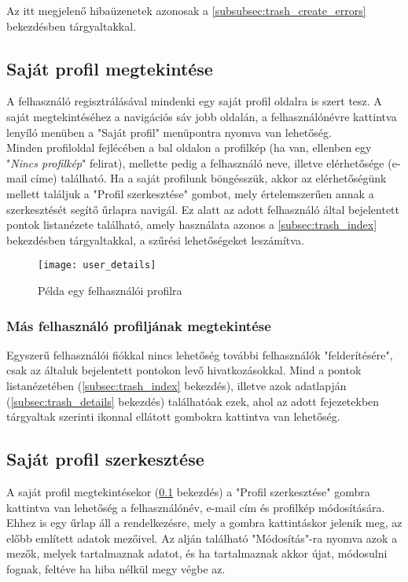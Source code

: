 Az itt megjelenő hibaüzenetek azonosak a \ref{subsubsec:trash_create_errors} bekezdésben tárgyaltakkal.

\subsection{Saját profil megtekintése}
\label{subsec:user_details}

A felhasználó regisztrálásával mindenki egy saját profil oldalra is szert tesz. A saját megtekintéséhez a navigációs sáv jobb oldalán, a felhasználónévre kattintva lenyíló menüben a "Saját profil" menüpontra nyomva van lehetőség.\\
Minden profiloldal fejlécében a bal oldalon a profilkép (ha van, ellenben egy "\textit{Nincs profilkép}" felirat), mellette pedig a felhasználó neve, illetve elérhetősége (e-mail címe) található. Ha a saját profilunk böngésszük, akkor az elérhetőségünk mellett találjuk a "Profil szerkesztése" gombot, mely értelemszerűen annak a szerkesztését segítő űrlapra navigál. Ez alatt az adott felhasználó által bejelentett pontok listanézete található, amely használata azonos a \ref{subsec:trash_index} bekezdésben tárgyaltakkal, a szűrési lehetőségeket leszámítva.

\begin{figure}[H]
	\centering
	\texttt{[image: user\_details]}
	\caption{Példa egy felhasználói profilra}
	\label{fig:user_details}
\end{figure}

\subsubsection{Más felhasználó profiljának megtekintése}

Egyszerű felhasználói fiókkal nincs lehetőség további felhasználók "felderítésére", csak az általuk bejelentett pontokon levő hivatkozásokkal. Mind a pontok listanézetében (\ref{subsec:trash_index} bekezdés), illetve azok adatlapján (\ref{subsec:trash_details} bekezdés) találhatóak ezek, ahol az adott fejezetekben tárgyaltak szerinti  ikonnal ellátott gombokra kattintva van lehetőség.

\subsection{Saját profil szerkesztése}
\label{subsec:user_edit}

A saját profil megtekintésekor (\ref{subsec:user_details} bekezdés) a "Profil szerkesztése" gombra kattintva van lehetőség a felhasználónév, e-mail cím és profilkép módosítására. Ehhez is egy űrlap áll a rendelkezésre, mely a gombra kattintáskor jelenik meg, az előbb említett adatok mezőivel. Az alján található "Módosítás"-ra nyomva azok a mezők, melyek tartalmaznak adatot, és ha tartalmaznak akkor újat, módosulni fognak, feltéve ha hiba nélkül megy végbe az.

